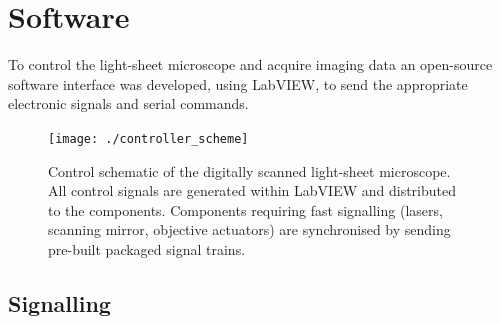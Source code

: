 \section{Software}

To control the \gls{light-sheet} microscope and acquire imaging data an open-source~\cite{russellSpimcontroller2017} software interface was developed, using \gls{LabVIEW}, to
send the appropriate electronic signals and serial commands.

\begin{figure}
    \centering
  \texttt{[image: ./controller\_scheme]} %
  \caption{Control schematic of the digitally scanned light-sheet microscope.
  All control signals are generated within \gls{LabVIEW} and distributed to the components.
  Components requiring fast signalling (lasers, scanning mirror, objective actuators) are synchronised by sending pre-built packaged signal trains.}\label{fig:control}
\end{figure}



\subsection{Signalling} %

